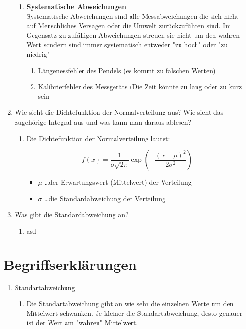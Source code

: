 \documentclass[fleqn,10pt]{olplainarticle}
\begin{document}
\begin{enumerate}
\begin{enumerate}
        \item \textbf{Systematische Abweichungen}  \\
            Systematische Abweichungen sind alle Messabweichungen die sich nicht auf Menschliches Versagen oder die Umwelt zurückzuführen sind. Im Gegensatz zu zufälligen Abweichungen streuen sie nicht um den wahren Wert sondern sind immer systematisch entweder "zu hoch" oder "zu niedrig"  
            \begin{enumerate}
                \item Längenessfehler des Pendels (es kommt zu falschen Werten)
                \item Kalibrierfehler des Messgeräts (Die Zeit könnte zu lang oder zu kurz sein
            \end{enumerate}
    \end{enumerate}
     \item Wie sieht die Dichtefunktion der Normalverteilung aus? Wie sieht das zugehörige Integral aus und was kann man daraus ablesen? 
     \begin{enumerate}
         \item Die Dichtefunktion der Normalverteilung lautet:
                
                \[
                f(x) = \frac{1}{\sigma \sqrt{2\pi}} \exp \left( - \frac{(x - \mu)^2}{2\sigma^2} \right)
                \]
                    \begin{itemize}
        \item \( \mu \) \dots der Erwartungswert (Mittelwert) der Verteilung
        \item \( \sigma \) \dots die Standardabweichung der Verteilung 
    \end{itemize}
     \end{enumerate}
     



     \item Was gibt die Standardabweichung an?  
     \begin{enumerate}
         \item asd
     \end{enumerate}
 \end{enumerate}

\section{Begriffserklärungen}
\begin{enumerate}
    \item Standartabweichung
    \begin{enumerate}
        \item Die Standartabweichung gibt an wie sehr die einzelnen Werte um den Mittelwert schwanken. Je kleiner die Standartabweichung, desto genauer ist der Wert am "wahren" Mittelwert.
    \end{enumerate}
    
\end{enumerate}
\end{document}
